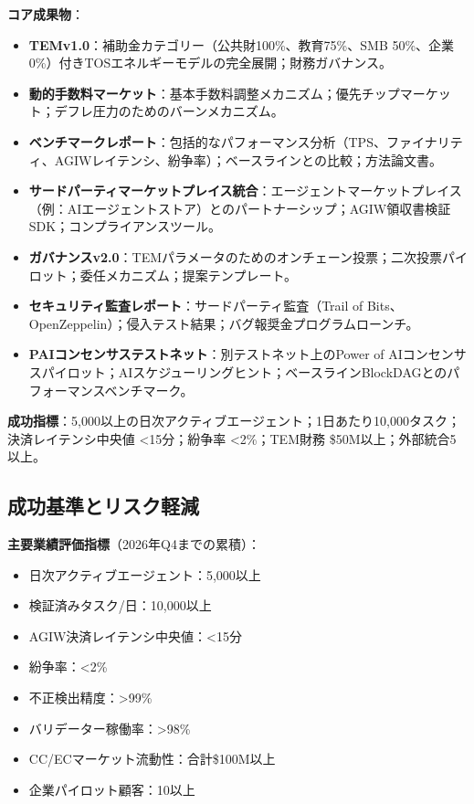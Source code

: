 \documentclass[11pt]{article}
\begin{document}
\textbf{コア成果物}：
\begin{itemize}[noitemsep]
  \item \textbf{TEMv1.0}：補助金カテゴリー（公共財100\%、教育75\%、SMB 50\%、企業0\%）付きTOSエネルギーモデルの完全展開；財務ガバナンス。
  \item \textbf{動的手数料マーケット}：基本手数料調整メカニズム；優先チップマーケット；デフレ圧力のためのバーンメカニズム。
  \item \textbf{ベンチマークレポート}：包括的なパフォーマンス分析（TPS、ファイナリティ、AGIWレイテンシ、紛争率）；ベースラインとの比較；方法論文書。
  \item \textbf{サードパーティマーケットプレイス統合}：エージェントマーケットプレイス（例：AIエージェントストア）とのパートナーシップ；AGIW領収書検証SDK；コンプライアンスツール。
  \item \textbf{ガバナンスv2.0}：TEMパラメータのためのオンチェーン投票；二次投票パイロット；委任メカニズム；提案テンプレート。
  \item \textbf{セキュリティ監査レポート}：サードパーティ監査（Trail of Bits、OpenZeppelin）；侵入テスト結果；バグ報奨金プログラムローンチ。
  \item \textbf{PAIコンセンサステストネット}：別テストネット上のPower of AIコンセンサスパイロット；AIスケジューリングヒント；ベースラインBlockDAGとのパフォーマンスベンチマーク。
\end{itemize}

\textbf{成功指標}：5,000以上の日次アクティブエージェント；1日あたり10,000タスク；決済レイテンシ中央値 <15分；紛争率 <2\%；TEM財務 \$50M以上；外部統合5以上。

\subsection{成功基準とリスク軽減}

\textbf{主要業績評価指標}（2026年Q4までの累積）：
\begin{itemize}[noitemsep]
  \item 日次アクティブエージェント：5,000以上
  \item 検証済みタスク/日：10,000以上
  \item AGIW決済レイテンシ中央値：<15分
  \item 紛争率：<2\%
  \item 不正検出精度：>99\%
  \item バリデーター稼働率：>98\%
  \item CC/ECマーケット流動性：合計\$100M以上
  \item 企業パイロット顧客：10以上
\end{itemize}
\end{document}
